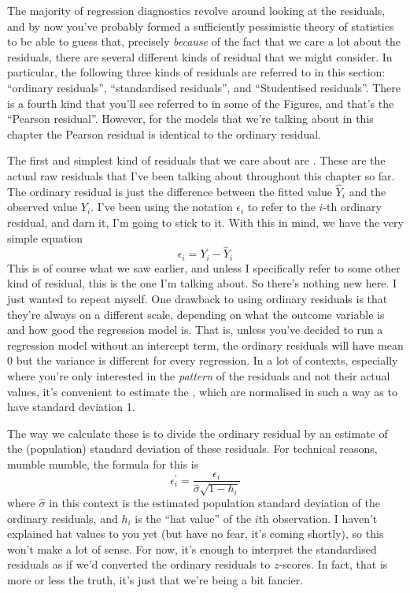 
The majority of regression diagnostics revolve around looking at the residuals, and by now you've probably formed a sufficiently pessimistic theory of statistics to be able to guess that, precisely {\it because} of the fact that we care a lot about the residuals, there are several different kinds of  residual that we might consider. In particular, the following three kinds of residuals are referred to in this section: ``ordinary residuals'', ``standardised residuals'', and ``Studentised residuals''. There is a fourth kind that you'll see referred to in some of the Figures, and that's the ``Pearson residual''. However, for the models that we're talking about in this chapter the Pearson residual is identical to the ordinary residual. 

The first and simplest kind of residuals that we care about are . These are the actual raw residuals that I've been talking about throughout this chapter so far. The ordinary residual is just the difference between the fitted value $\hat{Y}_i$ and the observed value $Y_i$. I've been using the notation $\epsilon_i$ to refer to the $i$-th ordinary residual, and darn it, I'm going to stick to it. With this in mind, we have the very simple equation
$$
\epsilon_i = Y_i - \hat{Y}_i
$$
This is of course what we saw earlier, and unless I specifically refer to some other kind of residual, this is the one I'm talking about. So there's nothing new here. I just wanted to repeat myself. One drawback to using ordinary residuals is that they're always on a different scale, depending on what the outcome variable is and how good the regression model is. That is, unless you've decided to run a regression model without an intercept term, the ordinary residuals will have mean 0 but the variance is different for every regression. In a lot of contexts, especially where you're only interested in the {\it pattern} of the residuals and not their actual values, it's convenient to estimate the , which are normalised in such a way as to have standard deviation 1. 

\vspace{0.5cm}
\begin{mdframed}[style=MyFrame,nobreak=false]
The way we calculate these is to divide the ordinary residual by an estimate of the (population) standard deviation of these residuals. For technical reasons, mumble mumble, the formula for this is
$$
\epsilon_{i}^\prime = \frac{\epsilon_i}{\hat{\sigma} \sqrt{1-h_i}}
$$
where $\hat\sigma$ in this context is the estimated population standard deviation of the ordinary residuals, and $h_i$ is the ``hat value'' of the $i$th observation. I haven't explained hat values to you yet (but have no fear, it's coming shortly), so this won't make a lot of sense. For now, it's enough to interpret the standardised residuals as if we'd converted the ordinary residuals to $z$-scores. In fact, that is more or less the truth, it's just that we're being a bit fancier. 
\end{mdframed}

